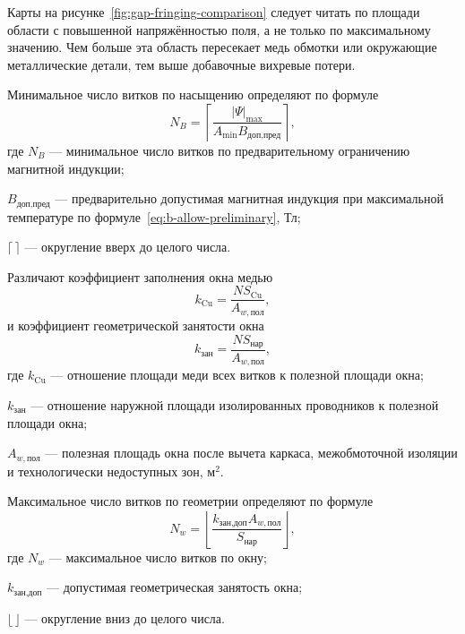 \documentclass[14pt,a4paper]{extarticle}
\begin{document}
Карты на рисунке~\ref{fig:gap-fringing-comparison} следует читать по
площади области с повышенной напряжённостью поля, а не только по
максимальному значению. Чем больше эта область пересекает медь обмотки или
окружающие металлические детали, тем выше добавочные вихревые потери.

Минимальное число витков по насыщению определяют по формуле
\begin{equation}
 N_B=
 \left\lceil
 \frac{\left|\Psi\right|_{\max}}
 {A_{\min}B_{\text{доп,пред}}}
 \right\rceil,
 \label{eq:n-min}
\end{equation}
где $N_B$ --- минимальное число витков по предварительному ограничению
магнитной индукции;\par\noindent
$B_{\text{доп,пред}}$ --- предварительно допустимая магнитная индукция при
максимальной температуре по формуле~\eqref{eq:b-allow-preliminary},
Тл;\par\noindent
$\lceil\,\rceil$ --- округление вверх до целого числа.

Различают коэффициент заполнения окна медью
\begin{equation}
 k_{\text{Cu}}=
 \frac{N S_{\text{Cu}}}{A_{w,\text{пол}}},
 \label{eq:window-copper-fill}
\end{equation}
и коэффициент геометрической занятости окна
\begin{equation}
 k_{\text{зан}}=
 \frac{N S_{\text{нар}}}{A_{w,\text{пол}}},
 \label{eq:window-occupancy}
\end{equation}
где $k_{\text{Cu}}$ --- отношение площади меди всех витков к полезной
площади окна;\par\noindent
$k_{\text{зан}}$ --- отношение наружной площади изолированных
проводников к полезной площади окна;\par\noindent
$A_{w,\text{пол}}$ --- полезная площадь окна после вычета каркаса,
межобмоточной изоляции и технологически недоступных зон, м$^2$.

Максимальное число витков по геометрии определяют по формуле
\begin{equation}
 N_w=
 \left\lfloor
 \frac{k_{\text{зан,доп}}A_{w,\text{пол}}}
 {S_{\text{нар}}}
 \right\rfloor,
 \label{eq:n-window-max}
\end{equation}
где $N_w$ --- максимальное число витков по окну;\par\noindent
$k_{\text{зан,доп}}$ --- допустимая геометрическая занятость окна;\par\noindent
$\lfloor\,\rfloor$ --- округление вниз до целого числа.
\end{document}
